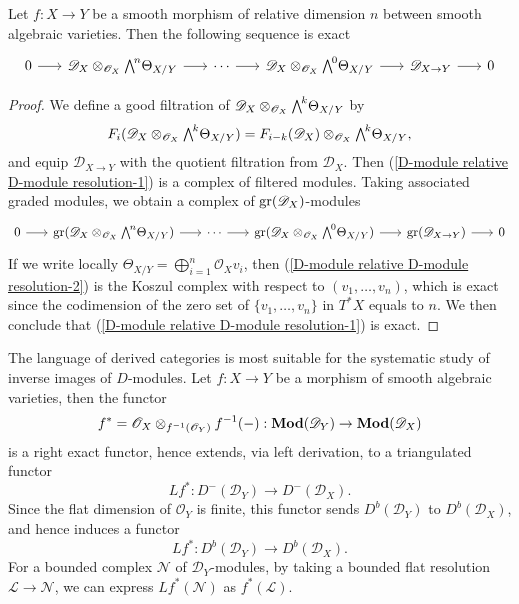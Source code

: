 \begin{proposition}\label{D-module relative D-module resolution}
Let $f:X\to Y$ be a smooth morphism of relative dimension $n$ between smooth algebraic varieties. Then the following sequence is exact 
\begin{equation}\label{D-module relative D-module resolution-1}
\begin{tikzcd}[column sep=6mm]
0\ar[r]&\mathscr{D}_X\otimes_{\mathscr{O}_X}\bigw^n\Theta_{X/Y}\ar[r]&\cdots\ar[r]&\mathscr{D}_X\otimes_{\mathscr{O}_X}\bigw^0\Theta_{X/Y}\ar[r]&\mathscr{D}_{X\to Y}\ar[r]&0
\end{tikzcd}
\end{equation}
\end{proposition}
\begin{proof}
We define a good filtration of $\mathscr{D}_X\otimes_{\mathscr{O}_X}\bigw^k\Theta_{X/Y}$ by
\[F_i(\mathscr{D}_X\otimes_{\mathscr{O}_X}\bigw^k\Theta_{X/Y})=F_{i-k}(\mathscr{D}_X)\otimes_{\mathscr{O}_X}\bigw^k\Theta_{X/Y},\]
and equip $\mathscr{D}_{X\to Y}$ with the quotient filtration from $\mathscr{D}_X$. Then (\ref{D-module relative D-module resolution-1}) is a complex of filtered modules. Taking associated graded modules, we obtain a complex of $\mathrm{gr}(\mathscr{D}_X)$-modules
\begin{equation}\label{D-module relative D-module resolution-2}
\begin{tikzcd}[column sep=6mm]
0\ar[r]&\gr(\mathscr{D}_X\otimes_{\mathscr{O}_X}\bigw^n\Theta_{X/Y})\ar[r]&\cdots\ar[r]&\gr(\mathscr{D}_X\otimes_{\mathscr{O}_X}\bigw^0\Theta_{X/Y})\ar[r]&\gr(\mathscr{D}_{X\to Y})\ar[r]&0
\end{tikzcd}
\end{equation}
If we write locally $\Theta_{X/Y}=\bigoplus_{i=1}^{n}\mathscr{O}_Xv_i$, then (\ref{D-module relative D-module resolution-2}) is the Koszul complex with respect to $(v_1,\dots,v_n)$, which is exact since the codimension of the zero set of $\{v_1,\dots,v_n\}$ in $T^*X$ equals to $n$. We then conclude that (\ref{D-module relative D-module resolution-1}) is exact.
\end{proof}

The language of derived categories is most suitable for the systematic study of inverse images of $D$-modules. Let $f:X\to Y$ be a morphism of smooth algebraic varieties, then the functor
\[f^*=\mathscr{O}_X\otimes_{f^{-1}(\mathscr{O}_Y)}f^{-1}(-):\mathbf{Mod}(\mathscr{D}_Y)\to\mathbf{Mod}(\mathscr{D}_X)\]
is a right exact functor, hence extends, via left derivation, to a triangulated functor
\[Lf^*:D^-(\mathscr{D}_Y)\to D^-(\mathscr{D}_X).\]
Since the flat dimension of $\mathscr{O}_Y$ is finite, this functor sends $D^b(\mathscr{D}_Y)$ to $D^b(\mathscr{D}_X)$, and hence induces a functor
\[Lf^*:D^b(\mathscr{D}_Y)\to D^b(\mathscr{D}_X).\]
For a bounded complex $\mathscr{N}$ of $\mathscr{D}_Y$-modules, by taking a bounded flat resolution $\mathscr{L}\to\mathscr{N}$, we can express $Lf^*(\mathscr{N})$ as $f^*(\mathscr{L})$.

